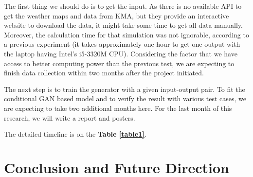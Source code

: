 \documentclass{article}
\begin{document}
\begin{doublespacing}
{  The first thing we should do is to get the input. As there is no available API to get the weather 
  maps and data from KMA, but they provide an interactive website to download the data, it might 
  take some time to get all data manually. Moreover, the calculation time for that simulation was 
  not ignorable, according to a previous experiment (it takes approximately one hour to get one 
  output with the laptop having Intel’s i5-3320M CPU). Considering the factor that we have access to
  better computing power than the previous test, we are expecting to finish data collection within 
  two months after the project initiated.

  The next step is to train the generator with a given input-output pair. To fit the conditional GAN
  based model and to verify the result with various test cases, we are expecting to take two 
  additional months here. For the last month of this research, we will write a report and posters.

  The detailed timeline is on the \textbf{Table \ref{table1}}.
}

\section{Conclusion and Future Direction} %
\fontsize{11pt}{11pt} \selectfont {
  We are expected to make a deep neural network model to predict possible pathway and area of 
  volcanic fallout ash spread faster than the previous methods, by using simpler and lighter input, 
  weather maps, compare to the weather dataset predicted by RDAPS. Not only reduce the computing 
  time to predict the spread, but the model aims to reproduce as the same result as possible 
  compares to the original training result. To verify our idea and model structure, we utilize 
  weather maps representing the weather conditions and volcanos near the Korean Peninsula.
}

\end{doublespacing}

\medskip



\end{document}
